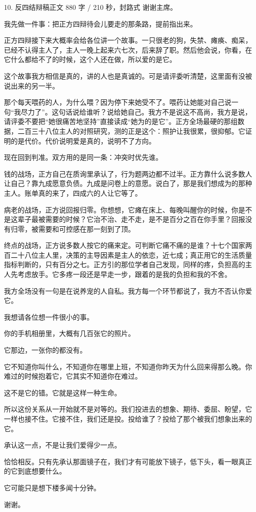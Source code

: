 \documentclass[script,con]{debate}
\begin{document}
\begin{speech}{10. 反四结辩稿}{正文 880 字 / 210 秒，封路式}
谢谢主席。

我先做一件事：把正方四辩待会儿要走的那条路，提前指出来。

正方四辩接下来大概率会给各位讲一个故事。一只很老的狗，失禁、瘫痪、痴呆，已经不认得主人了，主人一晚上起来六七次，后来辞了职。然后他会说，你看，在它什么都给不了的时候，这个人还在做，所以爱的是它。

这个故事我方相信是真的，讲的人也是真诚的。可是请评委听清楚，这里面有没被说出来的另一半。

那个每天喂药的人，为什么喂？因为停下来她受不了。喂药让她能对自己说一句“我尽力了”。这句话说给谁听？说给她自己。我方不是说这不高尚，我方是说，请评委不要把“她很痛苦地坚持”直接读成“她为的是它”。正方全场最硬的那组数据，二百三十八位主人的对照研究，测的正是这个：照护让我很累，很抑郁。它证明的是代价。代价说明爱是真的，说明不了方向。

现在回到判准。双方用的是同一条：冲突时优先谁。

钱的战场，正方自己在质询里承认了，行为题两边都不过半。正方靠什么说多数人让自己？靠九成愿意负债。九成是问卷上的意愿。说白了，那是我们想成为的那种主人。账单真的来了，四成六的人让它等了。

病老的战场，正方说回报归零。你想想，它瘫在床上、每晚叫醒你的时候，你是不是这辈子最被需要的时候？它治不治、走不走，是不是百分之百在你手里？回报没有归零，被需要和可控感在那一刻到了顶。

终点的战场，正方说多数人按它的痛来定。可判断它痛不痛的是谁？十七个国家两百二十八位主人里，决策的主导因素是主人的依恋，近七成；真正用它的生活质量指标判断的，只有百分之七。正方引的那位学者自己发现，同样的疼，负担高的主人先考虑放手。它多疼一段还是早走一步，跟着的是我的负担和我的不舍。

我方全场没有一句是在说养宠的人自私。我方每一个环节都说了，我方不否认你爱它。

我想请各位想一件很小的事。

你的手机相册里，大概有几百张它的照片。

它那边，一张你的都没有。

它不知道你叫什么，不知道你在哪里上班，不知道你昨天为什么回来得那么晚。你难过的时候抱着它，它其实不知道你在难过。

这不是它的错。它就是这样一种生命。

所以这份关系从一开始就不是对等的。我们投进去的想象、期待、委屈、盼望，它一样也接不住。它接不住，我们还是投。投给谁了？投给了那个被我们想象出来的它。

承认这一点，不是让我们爱得少一点。

恰恰相反。只有先承认那面镜子在，我们才有可能放下镜子，低下头，看一眼真正的它到底想要什么。

它可能只是想下楼多闻十分钟。

谢谢。
\end{speech}
\begin{contingency}
\end{contingency}
\end{document}
